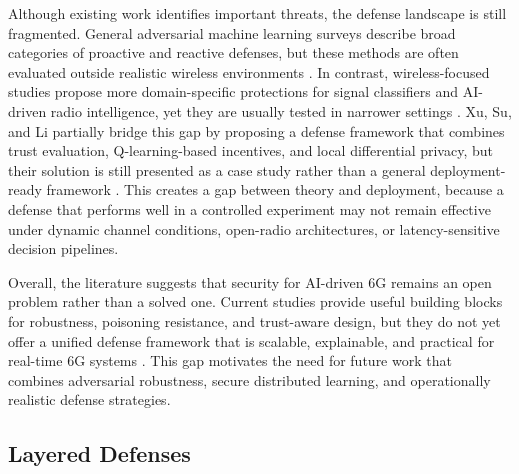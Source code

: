 \documentclass[letterpaper]{article} %
\begin{document}
Although existing work identifies important threats, the defense landscape is still fragmented. General adversarial machine learning surveys describe broad categories of proactive and reactive defenses, but these methods are often evaluated outside realistic wireless environments \cite{bountakas2023defense}. In contrast, wireless-focused studies propose more domain-specific protections for signal classifiers and AI-driven radio intelligence, yet they are usually tested in narrower settings \cite{ahmed2023cdi,chiejina2024oran}. Xu, Su, and Li partially bridge this gap by proposing a defense framework that combines trust evaluation, Q-learning-based incentives, and local differential privacy, but their solution is still presented as a case study rather than a general deployment-ready framework \cite{xu2022security}. This creates a gap between theory and deployment, because a defense that performs well in a controlled experiment may not remain effective under dynamic channel conditions, open-radio architectures, or latency-sensitive decision pipelines.


Overall, the literature suggests that security for AI-driven 6G remains an open problem rather than a solved one. Current studies provide useful building blocks for robustness, poisoning resistance, and trust-aware design, but they do not yet offer a unified defense framework that is scalable, explainable, and practical for real-time 6G systems \cite{xu2022security,bountakas2023defense,chiejina2024oran,ahmed2023cdi}. This gap motivates the need for future work that combines adversarial robustness, secure distributed learning, and operationally realistic defense strategies.


\subsection{Layered Defenses}
\end{document}
